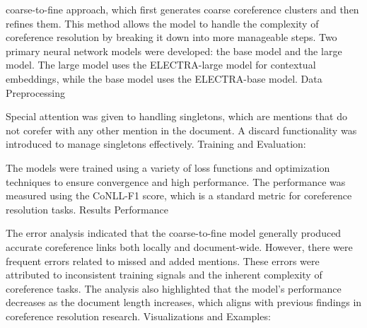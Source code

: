 \cite*{schroder-etal-2021-neural}
coarse-to-fine approach, which first generates coarse coreference clusters and then refines them. This method allows the model to handle the complexity of coreference resolution by breaking it down into more manageable steps.
Two primary neural network models were developed: the base model and the large model. The large model uses the ELECTRA-large model for contextual embeddings, while the base model uses the ELECTRA-base model.
Data Preprocessing

Special attention was given to handling singletons, which are mentions that do not corefer with any other mention in the document. A discard functionality was introduced to manage singletons effectively.
Training and Evaluation:

The models were trained using a variety of loss functions and optimization techniques to ensure convergence and high performance.
The performance was measured using the CoNLL-F1 score, which is a standard metric for coreference resolution tasks.
Results
Performance



The error analysis indicated that the coarse-to-fine model generally produced accurate coreference links both locally and document-wide. However, there were frequent errors related to missed and added mentions. These errors were attributed to inconsistent training signals and the inherent complexity of coreference tasks.
The analysis also highlighted that the model’s performance decreases as the document length increases, which aligns with previous findings in coreference resolution research.
Visualizations and Examples:

